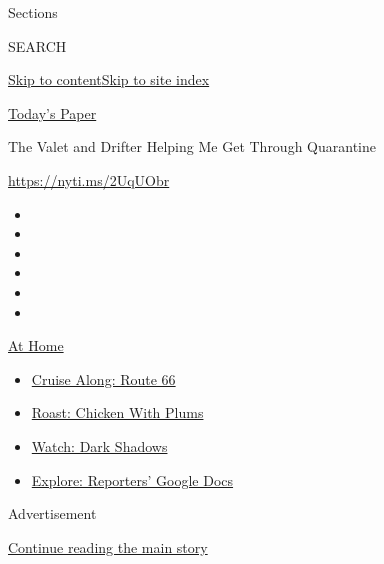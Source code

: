 Sections

SEARCH

\protect\hyperlink{site-content}{Skip to
content}\protect\hyperlink{site-index}{Skip to site index}

\href{https://myaccount.nytimes3xbfgragh.onion/auth/login?response_type=cookie\&client_id=vi}{}

\href{https://www.nytimes3xbfgragh.onion/section/todayspaper}{Today's
Paper}

The Valet and Drifter Helping Me Get Through Quarantine

\url{https://nyti.ms/2UqUObr}

\begin{itemize}
\item
\item
\item
\item
\item
\item
\end{itemize}

\href{https://www.nytimes3xbfgragh.onion/spotlight/at-home?action=click\&pgtype=Article\&state=default\&region=TOP_BANNER\&context=at_home_menu}{At
Home}

\begin{itemize}
\tightlist
\item
  \href{https://www.nytimes3xbfgragh.onion/2020/09/07/travel/route-66.html?action=click\&pgtype=Article\&state=default\&region=TOP_BANNER\&context=at_home_menu}{Cruise
  Along: Route 66}
\item
  \href{https://www.nytimes3xbfgragh.onion/2020/09/04/dining/sheet-pan-chicken.html?action=click\&pgtype=Article\&state=default\&region=TOP_BANNER\&context=at_home_menu}{Roast:
  Chicken With Plums}
\item
  \href{https://www.nytimes3xbfgragh.onion/2020/09/04/arts/television/dark-shadows-stream.html?action=click\&pgtype=Article\&state=default\&region=TOP_BANNER\&context=at_home_menu}{Watch:
  Dark Shadows}
\item
  \href{https://www.nytimes3xbfgragh.onion/interactive/2020/at-home/even-more-reporters-editors-diaries-lists-recommendations.html?action=click\&pgtype=Article\&state=default\&region=TOP_BANNER\&context=at_home_menu}{Explore:
  Reporters' Google Docs}
\end{itemize}

Advertisement

\protect\hyperlink{after-top}{Continue reading the main story}

